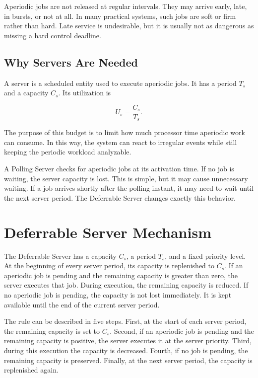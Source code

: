 \documentclass[conference]{IEEEtran}
\begin{document}
	Aperiodic jobs are not released at regular intervals. They may arrive early, late, in bursts, or not at all. In many practical systems, such jobs are soft or firm rather than hard. Late service is undesirable, but it is usually not as dangerous as missing a hard control deadline.
	
	\subsection{Why Servers Are Needed}
	
	A server is a scheduled entity used to execute aperiodic jobs. It has a period $T_s$ and a capacity $C_s$. Its utilization is
	
	\begin{equation}
		U_s = \frac{C_s}{T_s}.
	\end{equation}
	
	The purpose of this budget is to limit how much processor time aperiodic work can consume. In this way, the system can react to irregular events while still keeping the periodic workload analyzable.
	
	A Polling Server checks for aperiodic jobs at its activation time. If no job is waiting, the server capacity is lost. This is simple, but it may cause unnecessary waiting. If a job arrives shortly after the polling instant, it may need to wait until the next server period. The Deferrable Server changes exactly this behavior.
	
	\section{Deferrable Server Mechanism}
	
	The Deferrable Server has a capacity $C_s$, a period $T_s$, and a fixed priority level. At the beginning of every server period, its capacity is replenished to $C_s$. If an aperiodic job is pending and the remaining capacity is greater than zero, the server executes that job. During execution, the remaining capacity is reduced. If no aperiodic job is pending, the capacity is not lost immediately. It is kept available until the end of the current server period.
	
	The rule can be described in five steps. First, at the start of each server period, the remaining capacity is set to $C_s$. Second, if an aperiodic job is pending and the remaining capacity is positive, the server executes it at the server priority. Third, during this execution the capacity is decreased. Fourth, if no job is pending, the remaining capacity is preserved. Finally, at the next server period, the capacity is replenished again.
	
\end{document}
